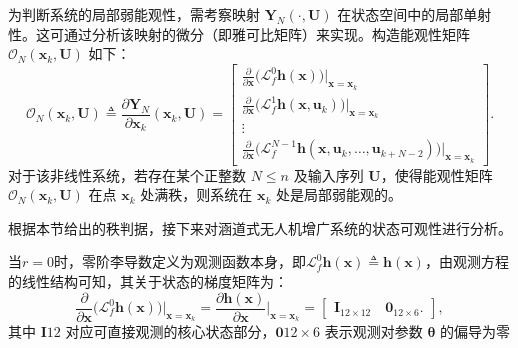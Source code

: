 为判断系统的局部弱能观性，需考察映射 $\bm{Y}_N(\cdot, \bm{U})$ 在状态空间中的局部单射性。这可通过分析该映射的微分（即雅可比矩阵）来实现。构造能观性矩阵 $\mathcal{O}_N(\bm{x}_k, \bm{U})$ 如下：
\begin{equation}\label{eq:observability_matrix}
\mathcal{O}_N(\bm{x}_k, \bm{U}) \triangleq 
\frac{\partial \bm{Y}_N}{\partial \bm{x}_k}(\bm{x}_k, \bm{U})
= 
\begin{bmatrix}
\displaystyle \frac{\partial}{\partial \bm{x}}\big( \mathcal{L}_f^0 \bm{h}(\bm{x}) \big)\Big|_{\bm{x}=\bm{x}_k} \\[10pt]
\displaystyle \frac{\partial}{\partial \bm{x}}\big( \mathcal{L}_f^1 \bm{h}(\bm{x}, \bm{u}_k) \big)\Big|_{\bm{x}=\bm{x}_k} \\[10pt]
\vdots \\[10pt]
\displaystyle \frac{\partial}{\partial \bm{x}}\big( \mathcal{L}_f^{N-1} \bm{h}(\bm{x}, \bm{u}_k, \dots, \bm{u}_{k+N-2}) \big)\Big|_{\bm{x}=\bm{x}_k}
\end{bmatrix}.
\end{equation}
对于该非线性系统，若存在某个正整数 $N \le n$ 及输入序列 $\bm{U}$，使得能观性矩阵 $\mathcal{O}_N(\bm{x}_k, \bm{U})$ 在点 $\bm{x}_k$ 处满秩，则系统在 $\bm{x}_k$ 处是局部弱能观的。

根据本节给出的秩判据，接下来对涵道式无人机增广系统的状态可观性进行分析。

当$r=0$时，零阶李导数定义为观测函数本身，即$\mathcal{L}_f^0 \bm{h}(\bm{x}) \triangleq \bm{h}(\bm{x})$，由观测方程的线性结构可知，其关于状态的梯度矩阵为：
\begin{equation}
    \frac{\partial}{\partial \bm{x}}\big( \mathcal{L}_f^0 \bm{h}(\bm{x}) \big)\Big|_{\bm{x}=\bm{x}_k} = \frac{\partial \bm{h}(\bm{x})}{\partial \bm{x}}\Big|_{\bm{x}=\bm{x}_k} = 
    \begin{bmatrix}
        \bm{I}_{12 \times 12} \quad \bm{0}_{12 \times 6}.
    \end{bmatrix},
    \label{eq:L0fh}
\end{equation}
其中 $\bm{I}{12}$ 对应可直接观测的核心状态部分，$\bm{0}{12\times 6}$ 表示观测对参数 $\bm{\theta}$ 的偏导为零

